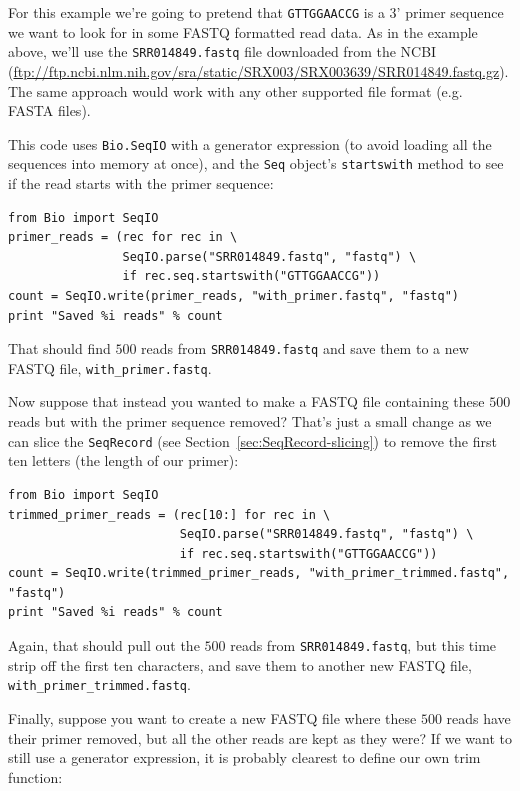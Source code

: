 \documentclass{report}
\begin{document}
For this example we're going to pretend that \texttt{GTTGGAACCG} is a 3' primer
sequence we want to look for in some FASTQ formatted read data.  As in the example
above, we'll use the \texttt{SRR014849.fastq} file downloaded from the NCBI
(\url{ftp://ftp.ncbi.nlm.nih.gov/sra/static/SRX003/SRX003639/SRR014849.fastq.gz}).
The same approach would work with any other supported file format (e.g. FASTA files).

This code uses \verb|Bio.SeqIO| with a generator expression (to avoid loading
all the sequences into memory at once), and the \verb|Seq| object's
\verb|startswith| method to see if the read starts with the primer sequence:

\begin{verbatim}
from Bio import SeqIO
primer_reads = (rec for rec in \
                SeqIO.parse("SRR014849.fastq", "fastq") \
                if rec.seq.startswith("GTTGGAACCG"))
count = SeqIO.write(primer_reads, "with_primer.fastq", "fastq")
print "Saved %i reads" % count
\end{verbatim}

\noindent That should find $500$ reads from \texttt{SRR014849.fastq} and save them to
a new FASTQ file, \texttt{with\_primer.fastq}.

Now suppose that instead you wanted to make a FASTQ file containing these $500$ reads
but with the primer sequence removed?  That's just a small change as we can slice the
\verb|SeqRecord| (see Section~\ref{sec:SeqRecord-slicing}) to remove the first ten
letters (the length of our primer):

\begin{verbatim}
from Bio import SeqIO
trimmed_primer_reads = (rec[10:] for rec in \
                        SeqIO.parse("SRR014849.fastq", "fastq") \
                        if rec.seq.startswith("GTTGGAACCG"))
count = SeqIO.write(trimmed_primer_reads, "with_primer_trimmed.fastq", "fastq")
print "Saved %i reads" % count
\end{verbatim}

\noindent Again, that should pull out the $500$ reads from \texttt{SRR014849.fastq},
but this time strip off the first ten characters, and save them to another new
FASTQ file, \texttt{with\_primer\_trimmed.fastq}.

Finally, suppose you want to create a new FASTQ file where these $500$ reads have
their primer removed, but all the other reads are kept as they were?
If we want to still use a generator expression, it is probably clearest to
define our own trim function:
\end{document}
